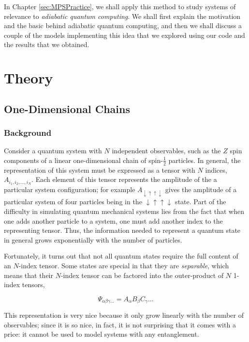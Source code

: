 \documentclass[12pt]{amsbook}
\theoremstyle{plain}
\theoremstyle{definition}
\theoremstyle{remark}
\newcommand{\eqn}[2][]{\begin{equation}\label{#1}#2\end{equation}}
\newcommand{\half}{\frac{1}{2}}
\begin{document}
In Chapter \ref{sec:MPSPractice}, we shall apply this method to study systems of relevance to \emph{adiabatic quantum computing}.  We shall first explain the motivation and the basic behind adiabatic quantum computing, and then we shall discuss a couple of the models implementing this idea that we explored using our code and the results that we obtained.
\chapter{Theory}
\label{sec:MPSTheory}
\section{One-Dimensional Chains}
\subsection{Background}

Consider a quantum system with $N$ independent observables, such as the $Z$ spin components of a linear one-dimensional chain of spin-$\half$ particles.  In general, the representation of this system must be expressed as a tensor with $N$ indices, $A_{i_1,i_2,\dots,i_N}$.  Each element of this tensor represents the amplitude of the a particular system configuration; for example $A_{\downarrow\uparrow\uparrow\downarrow}$ gives the amplitude of a particular system of four particles being in the $\downarrow\uparrow\uparrow\downarrow$ state.  Part of the difficulty in simulating quantum mechanical systems lies from the fact that when one adds another particle to a system, one must add another index to the representing tensor.  Thus, the information needed to represent a quantum state in general grows exponentially with the number of particles.

Fortunately, it turns out that not all quantum states require the full content of an $N$-index tensor.  Some states are special in that they are \textit{separable}, which means that their $N$-index tensor can be factored into the outer-product of $N$ 1-index tensors,

\eqn[separable]{\Psi_{\alpha\beta\gamma\dots} = A_\alpha B_\beta C_\gamma \dots}

This representation is very nice because it only grow linearly with the number of observables;  since it is so nice, in fact, it is not surprising that it comes with a price:  it cannot be used to model systems with any entanglement.
\end{document}
